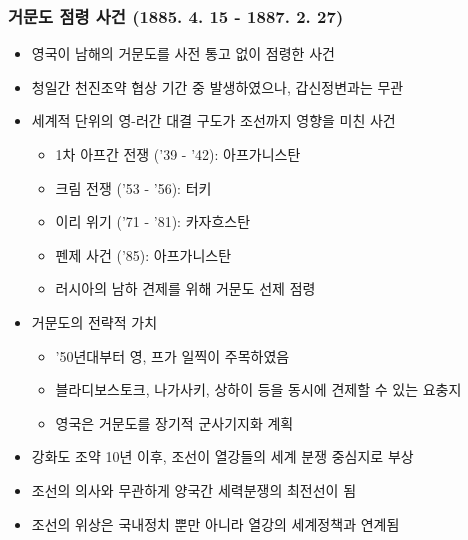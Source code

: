 \subsubsection*{거문도 점령 사건 (1885. 4. 15 - 1887. 2. 27)}
\begin{itemize}
    \item 영국이 남해의 거문도를 사전 통고 없이 점령한 사건
    \item 청일간 천진조약 협상 기간 중 발생하였으나, 갑신정변과는 무관
    \item 세계적 단위의 영-러간 대결 구도가 조선까지 영향을 미친 사건
    \begin{itemize}
        \item 1차 아프간 전쟁 ('39 - '42): 아프가니스탄
        \item 크림 전쟁 ('53 - '56): 터키
        \item 이리 위기 ('71 - '81): 카자흐스탄
        \item 펜제 사건 ('85): 아프가니스탄
        \item 러시아의 남하 견제를 위해 거문도 선제 점령
    \end{itemize}
    \item 거문도의 전략적 가치
    \begin{itemize}
        \item '50년대부터 영, 프가 일찍이 주목하였음
        \item 블라디보스토크, 나가사키, 상하이 등을 동시에 견제할 수 있는 요충지
        \item 영국은 거문도를 장기적 군사기지화 계획
    \end{itemize}
    \item 강화도 조약 10년 이후, 조선이 열강들의 세계 분쟁 중심지로 부상
    \item 조선의 의사와 무관하게 양국간 세력분쟁의 최전선이 됨
    \item 조선의 위상은 국내정치 뿐만 아니라 열강의 세계정책과 연계됨
\end{itemize}

